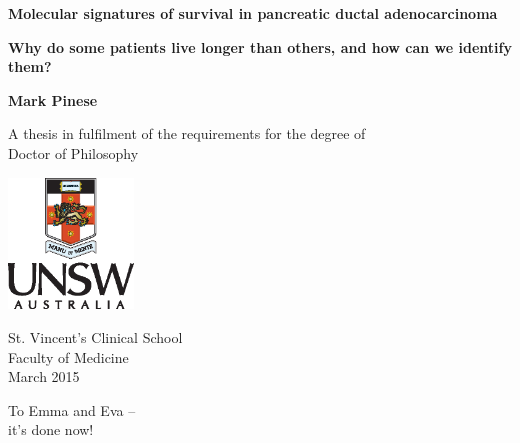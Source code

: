\documentclass[11pt,a4paper,final,twoside]{memoir}
\newcommand{\thesisTitleMain}{Molecular signatures of survival in pancreatic ductal adenocarcinoma}
\newcommand{\thesisTitleSUB}{Why do some patients live longer than others, and how can we identify them?}
\begin{document}
\increaseBuild
\cleardoublepage

\begin{titlingpage}
    \begin{center}
        \vspace*{1cm}
        
        \Large
        \textbf{\thesisTitleMain{}}
        
        \vspace{1cm}
        \normalsize
        \textbf{\thesisTitleSUB{}}
        
        \vspace{2.25cm}
        
        \normalsize
        \textbf{Mark Pinese}
        
        \vfill
        
        A thesis in fulfilment of the requirements for the degree of\\
        Doctor of Philosophy
        
        \vspace{3cm}
        
        \includegraphics[width=0.25\textwidth]{resources/PortraitColourPos}

        \vspace{1.5cm}

        St. Vincent's Clinical School\\
        Faculty of Medicine\\

		\vspace{1.2cm}
        March 2015
    \end{center}
\end{titlingpage}


\cleardoublepage


\frontmatter

\cleardoublepage
{}
\begin{adjustwidth}{2em}{2em}
\noindent
To Emma and Eva -- ~\\
\hspace{1cm}it's done now!
\end{adjustwidth}
\end{document}
